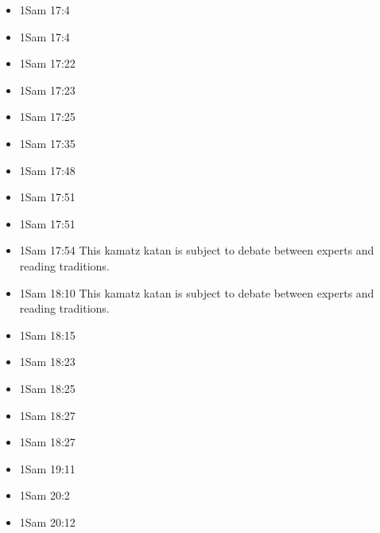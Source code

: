 \documentclass[14pt]{book}
\begin{document}
\begin{multicols}{2}
\begin{itemize}
							\item 1Sam 17:4
							
							\item 1Sam 17:4
							
							\item 1Sam 17:22
							
							\item 1Sam 17:23
							
							\item 1Sam 17:25
							
							\item 1Sam 17:35
							
							\item 1Sam 17:48
							
							\item 1Sam 17:51
							
							\item 1Sam 17:51
							
							\item 1Sam 17:54 This kamatz katan is subject to debate between experts and reading traditions.
							
							\item 1Sam 18:10 This kamatz katan is subject to debate between experts and reading traditions.
							
							\item 1Sam 18:15
							
							\item 1Sam 18:23
							
							\item 1Sam 18:25
							
							\item 1Sam 18:27
							
							\item 1Sam 18:27
							
							\item 1Sam 19:11
							
							\item 1Sam 20:2
							
							\item 1Sam 20:12
							

\end{itemize}
\end{multicols}
\end{document}
